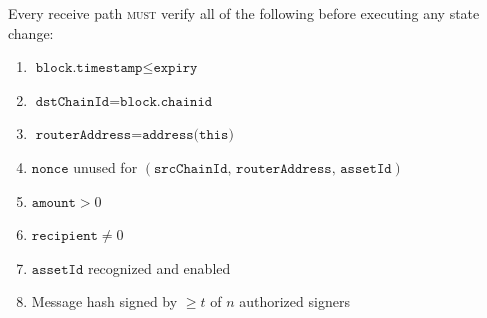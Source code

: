 \begin{requirement}
\label{req:verify}
Every receive path \textsc{must} verify all of the following before executing any state change:
\begin{enumerate}[nosep]
  \item $\texttt{block.timestamp} \leq \texttt{expiry}$
  \item $\texttt{dstChainId} = \texttt{block.chainid}$
  \item $\texttt{routerAddress} = \texttt{address(this)}$
  \item $\texttt{nonce}$ unused for $(\texttt{srcChainId},\, \texttt{routerAddress},\, \texttt{assetId})$
  \item $\texttt{amount} > 0$
  \item $\texttt{recipient} \neq 0$
  \item $\texttt{assetId}$ recognized and enabled
  \item Message hash signed by $\geq t$ of $n$ authorized signers
\end{enumerate}
\end{requirement}


